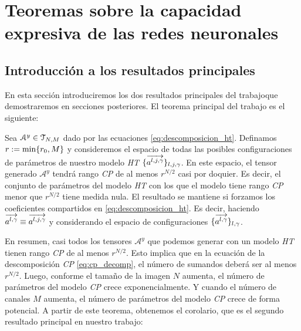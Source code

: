 \chapter{Teoremas sobre la capacidad expresiva de las redes neuronales} \label{chapter:teoremas_y_demostraciones}

\section{Introducción a los resultados principales}

En esta sección introduciremos los dos resultados principales del trabajoque demostraremos en secciones posteriores. El teorema principal del trabajo es el siguiente:

\begin{teorema} \label{teorema:teorema_principal_introduccion}

Sea $\mathcal{A}^y \in \mathcal{T}_{N, M}$ dado por las ecuaciones \eqref{eq:descomposicion_ht}. Definamos $r := \min \{ r_0, M \}$ y consideremos el espacio de todas las posibles configuraciones de parámetros de nuestro modelo \textit{HT} $\{  \overrightarrow{a^{l, j, \gamma}} \}_{l, j, \gamma}$. En este espacio, el tensor generado $\mathcal{A}^y$ tendrá rango \textit{CP} de al menos $r^{N/2}$ casi por doquier. Es decir, el conjunto de parámetros del modelo \textit{HT} con los que el modelo tiene rango \textit{CP} menor que $r^{N/2}$ tiene medida nula. El resultado se mantiene si forzamos los coeficientes compartidos en \eqref{eq:descomposicion_ht}. Es decir, haciendo $\overrightarrow{a^{l, \gamma}} \equiv \overrightarrow{a^{l, j, \gamma}}$ y considerando el espacio de configuraciones $\{ \overrightarrow{a^{l, \gamma}}  \}_{l, \gamma}$.

\end{teorema}

En resumen, casi todos los tensores $\mathcal{A}^y$ que podemos generar con un modelo \textit{HT} tienen rango \textit{CP} de al menos $r^{N/2}$. Esto implica que en la ecuación de la descomposición \textit{CP} \eqref{eq:cp_decomp}, el número de sumandos deberá ser al menos $r^{N/2}$. Luego, conforme el tamaño de la imagen $N$ aumenta, el número de parámetros del modelo \textit{CP} crece exponencialmente. Y cuando el número de canales $M$ aumenta, el número de parámetros del modelo \textit{CP} crece de forma potencial. A partir de este teorema, obtenemos el corolario, que es el segundo resultado principal en nuestro trabajo:

